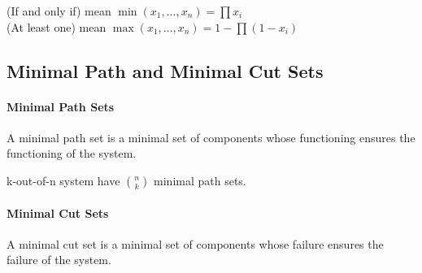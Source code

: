 \begin{note}
    {\color{blue}(If and only if)} mean $\min(x_1,...,x_n) = \prod x_i$ \\
    {\color{blue}(At least one)} mean $\max(x_1,...,x_n) = 1 - \prod (1 - x_i)$
\end{note}

\subsection{Minimal Path and Minimal Cut Sets}

\paragraph{Minimal Path Sets}
A minimal path set is a minimal set of components whose functioning ensures the functioning of the system.

\begin{note}
    k-out-of-n system have $\binom{n}{k}$ minimal path sets.
\end{note}

\paragraph{Minimal Cut Sets}
A minimal cut set is a minimal set of components whose failure ensures the failure of the system.
